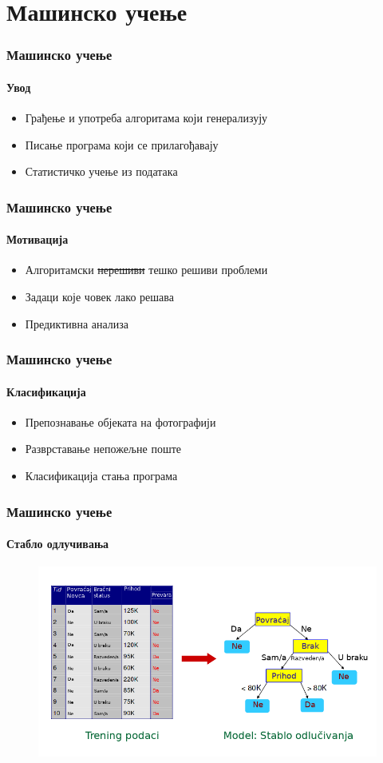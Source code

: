 \documentclass{beamer}
\begin{document}
\section{Машинско учење}

\begin{frame}
\frametitle{Машинско учење}
\framesubtitle{Увод}
\begin{itemize}
 	\item Грађење и употреба алгоритама који генерализују
	\item Писање програма који се прилагођавају
	\item Статистичко учење из података
\end{itemize}
\end{frame}
\begin{frame}
\frametitle{Машинско учење}
\framesubtitle{Мотивација}
\begin{itemize}
 	\item Алгоритамски \sout{нерешиви} тешко решиви проблеми
 	\item Задаци које човек лако решава
	\item Предиктивна анализа
\end{itemize}
\end{frame}
\begin{frame}
\frametitle{Машинско учење}
\framesubtitle{Класификација}
\begin{itemize}
 	\item Препознавање објеката на фотографији
 	\item Разврставање непожељне поште
 	\item Класификација стања програма
\end{itemize}
\end{frame}
\begin{frame}
\frametitle{Машинско учење}
\framesubtitle{Стабло одлучивања}
\begin{figure}
\centering
\includegraphics[scale=0.4]{slike/decision_tree.png}
\end{figure}
\end{frame}
\end{document}
